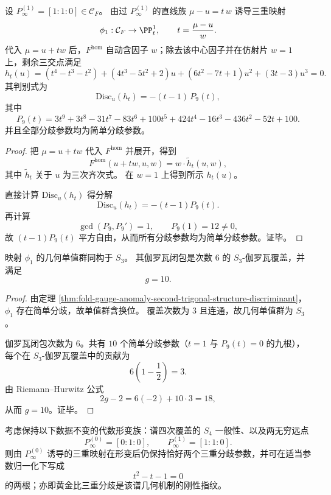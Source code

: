 \begin{theorem}[第二三重结构的参数判别式]\label{thm:fold-gauge-anomaly-second-trigonal-structure-discriminant}
设 \(P_\infty^{(1)}=[1:1:0]\in\mathcal C_F\)。
由过 \(P_\infty^{(1)}\) 的直线族 \(\mu-u=t\,w\) 诱导三重映射
\[
\phi_1:\mathcal C_F\to\PP^1_t,\qquad t=\frac{\mu-u}{w}.
\]
代入 \(\mu=u+t w\) 后，\(F^{\mathrm{hom}}\) 自动含因子 \(w\)；除去该中心因子并在仿射片 \(w=1\) 上，剩余三交点满足
\[
h_t(u)= (t^4-t^3-t^2)+ (4t^3-5t^2+2)u+(6t^2-7t+1)u^2+(3t-3)u^3=0.
\]
其判别式为
\[
\mathrm{Disc}_u(h_t)=-(t-1)\,P_9(t),
\]
其中
\[
P_9(t)=3t^9+3t^8-31t^7-83t^6+100t^5+424t^4-16t^3-436t^2-52t+100.
\]
并且全部分歧参数均为简单分歧参数。
\end{theorem}
\begin{proof}
把 \(\mu=u+t w\) 代入 \(F^{\mathrm{hom}}\) 并展开，得到
\[
F^{\mathrm{hom}}(u+t w,u,w)=w\cdot \widetilde h_t(u,w),
\]
其中 \(\widetilde h_t\) 关于 \(u\) 为三次齐次式。
在 \(w=1\) 上得到所示 \(h_t(u)\)。

直接计算 \(\mathrm{Disc}_u(h_t)\) 得分解
\[
\mathrm{Disc}_u(h_t)=-(t-1)P_9(t).
\]
再计算
\[
\gcd(P_9,P_9')=1,\qquad P_9(1)=12\neq 0,
\]
故 \((t-1)P_9(t)\) 平方自由，从而所有分歧参数均为简单分歧参数。证毕。
\end{proof}



\begin{corollary}[第二三重结构的几何单值群与伽罗瓦闭包亏格]\label{cor:fold-gauge-anomaly-second-trigonal-monodromy-genus}
映射 \(\phi_1\) 的几何单值群同构于 \(S_3\)。
其伽罗瓦闭包是次数 \(6\) 的 \(S_3\)-伽罗瓦覆盖，并满足
\[
g=10.
\]
\end{corollary}
\begin{proof}
由定理 \ref{thm:fold-gauge-anomaly-second-trigonal-structure-discriminant}，\(\phi_1\) 存在简单分歧，故单值群含换位。
覆盖次数为 \(3\) 且连通，故几何单值群为 \(S_3\)。

伽罗瓦闭包次数为 \(6\)。共有 \(10\) 个简单分歧参数（\(t=1\) 与 \(P_9(t)=0\) 的九根），每个在 \(S_3\)-伽罗瓦覆盖中的贡献为
\[
6\left(1-\frac12\right)=3.
\]
由 Riemann--Hurwitz 公式
\[
2g-2=6(-2)+10\cdot 3=18,
\]
从而 \(g=10\)。证毕。
\end{proof}

\begin{conjecture}[黄金比三重分歧的结构刚性]\label{conj:fold-gauge-anomaly-golden-ratio-triple-branch-rigidity}
考虑保持以下数据不变的代数形变族：谱四次覆盖的 \(S_4\) 一般性、以及两无穷远点
\[
P_\infty^{(0)}=[0:1:0],\qquad P_\infty^{(1)}=[1:1:0].
\]
则由 \(P_\infty^{(0)}\) 诱导的三重映射在形变后仍保持恰好两个三重分歧参数，并可在适当参数归一化下写成
\[
t^2-t-1=0
\]
的两根；亦即黄金比三重分歧是该谱几何机制的刚性指纹。
\end{conjecture}
